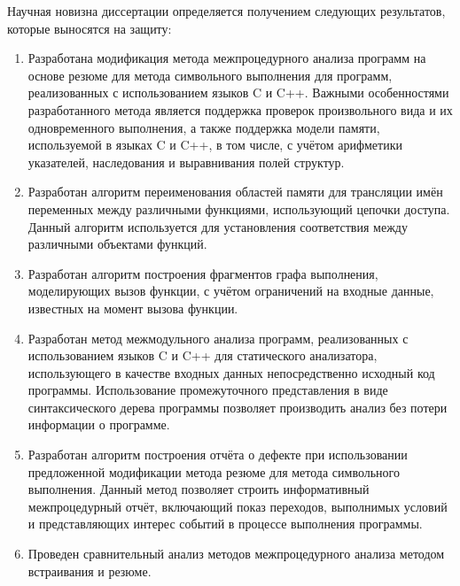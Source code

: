 {Научная новизна диссертации определяется получением следующих результатов, которые выносятся на защиту:
\begin{enumerate}
  \item Разработана модификация метода межпроцедурного анализа программ на основе резюме для метода символьного выполнения для программ, реализованных с использованием языков C и C++. Важными особенностями разработанного метода является поддержка проверок произвольного вида и их одновременного выполнения, а также поддержка модели памяти, используемой в языках C и C++, в том числе, с учётом арифметики указателей, наследования и выравнивания полей структур.
  \item Разработан алгоритм переименования областей памяти для трансляции имён переменных между различными функциями, использующий цепочки доступа. Данный алгоритм используется для установления соответствия между различными объектами функций.
  \item Разработан алгоритм построения фрагментов графа выполнения, моделирующих вызов функции, с учётом ограничений на входные данные, известных на момент вызова функции.
  \item Разработан метод межмодульного анализа программ, реализованных с использованием языков C и C++ для статического анализатора, использующего в качестве входных данных непосредственно исходный код программы. Использование промежуточного представления в виде синтаксического дерева программы позволяет производить анализ без потери информации о программе.
  \item Разработан алгоритм построения отчёта о дефекте при использовании предложенной модификации метода резюме для метода символьного выполнения. Данный метод позволяет строить информативный межпроцедурный отчёт, включающий показ переходов, выполнимых условий и представляющих интерес событий в процессе выполнения программы.
  \item Проведен сравнительный анализ методов межпроцедурного анализа методом встраивания и резюме. 


\end{enumerate}}
